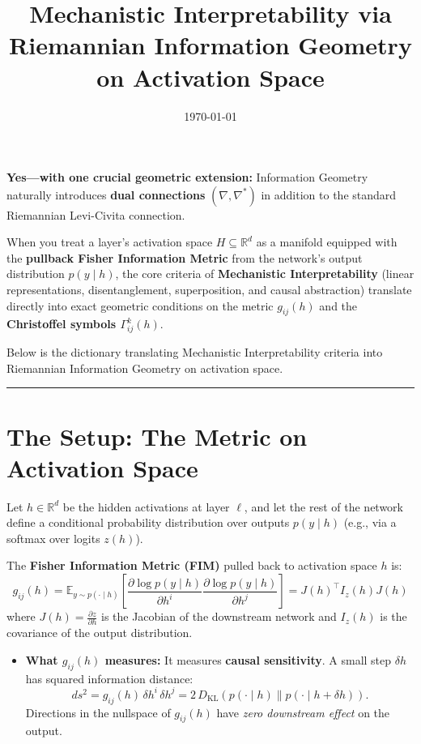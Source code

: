 \documentclass[11pt,a4paper]{article}
\title{\textbf{Mechanistic Interpretability via Riemannian Information Geometry on Activation Space}}
\author{}
\date{\today}
\begin{document}
\maketitle

\noindent
\textbf{Yes---with one crucial geometric extension:} Information Geometry naturally introduces \textbf{dual connections} $(\nabla, \nabla^*)$ in addition to the standard Riemannian Levi-Civita connection.

When you treat a layer's activation space $H \subseteq \mathbb{R}^d$ as a manifold equipped with the \textbf{pullback Fisher Information Metric} from the network's output distribution $p(y \mid h)$, the core criteria of \textbf{Mechanistic Interpretability} (linear representations, disentanglement, superposition, and causal abstraction) translate directly into exact geometric conditions on the metric $g_{ij}(h)$ and the \textbf{Christoffel symbols $\Gamma^k_{ij}(h)$}.

Below is the dictionary translating Mechanistic Interpretability criteria into Riemannian Information Geometry on activation space.

\vspace{0.5em}
\hrule
\vspace{0.5em}

\section{The Setup: The Metric on Activation Space}

Let $h \in \mathbb{R}^d$ be the hidden activations at layer $\ell$, and let the rest of the network define a conditional probability distribution over outputs $p(y \mid h)$ (e.g., via a softmax over logits $z(h)$).

The \textbf{Fisher Information Metric (FIM)} pulled back to activation space $h$ is:
\[
g_{ij}(h) = \mathbb{E}_{y \sim p(\cdot \mid h)} \left[ \frac{\partial \log p(y \mid h)}{\partial h^i} \frac{\partial \log p(y \mid h)}{\partial h^j} \right] = J(h)^\top I_z(h) J(h)
\]
where $J(h) = \frac{\partial z}{\partial h}$ is the Jacobian of the downstream network and $I_z(h)$ is the covariance of the output distribution.

\begin{itemize}[leftmargin=*]
    \item \textbf{What $g_{ij}(h)$ measures:} It measures \textbf{causal sensitivity}. A small step $\delta h$ has squared information distance:
    \[
    ds^2 = g_{ij}(h) \, \delta h^i \, \delta h^j = 2 \, D_{\text{KL}}\!\left(p(\cdot \mid h) \parallel p(\cdot \mid h + \delta h)\right).
    \]
    Directions in the nullspace of $g_{ij}(h)$ have \emph{zero downstream effect} on the output.
\end{itemize}
\end{document}
